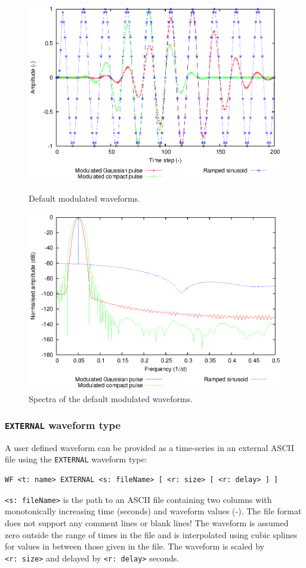 \documentclass[onecolumn,a4paper]{article}
\numberwithin{equation}{section}
\begin{document}
\begin{figure}[p]
  \begin{center}
    \includegraphics[width=0.9\linewidth]{figures/waveforms_mod_td}
  \end{center}
  \caption{\label{fg:wfmodtd}Default modulated waveforms.}
  \begin{center}
    \includegraphics[width=0.9\linewidth]{figures/waveforms_mod_fd}
  \end{center}
  \caption{\label{fg:wfmodfd}Spectra of the default modulated waveforms.}
\end{figure}

\subsubsection{\texttt{EXTERNAL} waveform type}

A user defined waveform can be provided as a time-series in an external
ASCII file using the \texttt{EXTERNAL} waveform type:
\begin{verbatim}
WF <t: name> EXTERNAL <s: fileName> [ <r: size> [ <r: delay> ] ]
\end{verbatim}
\texttt{<s:~fileName>} is the path to an ASCII file containing two columns with monotonically increasing
time (seconds) and waveform values (-). The file format does not support any comment lines or blank lines!  The waveform 
is assumed zero outside the range of times in the file and is interpolated using cubic splines for 
values in between those given in the file. The waveform is scaled by
\texttt{<r:~size>} and delayed by \texttt{<r:~delay>} seconds.
\end{document}
